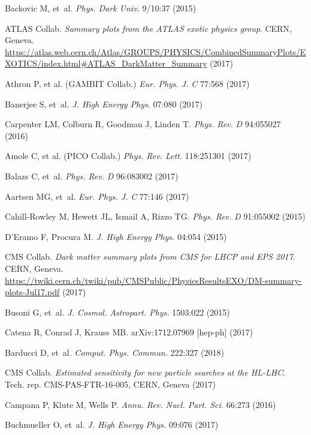 \documentclass{ar-1col}
\begin{document}
\begin{thebibliography}{175}
Backovic M, et~al. \textit{Phys. Dark Univ.} 9/10:37 (2015)

ATLAS Collab. \textit{Summary plots from the ATLAS exotic
physics group}. CERN, Geneva. \url{https://atlas.web.cern.ch/Atlas/GROUPS/PHYSICS/CombinedSummaryPlots/EXOTICS/index.html#ATLAS_DarkMatter_Summary} (2017)


{Athron P, et al. (GAMBIT Collab}.) \textit{Eur. Phys. J.} \textit{C} 77:568 (2017)

Banerjee S, et~al. \textit{J. High Energy Phys.} 07:080 (2017)

Carpenter LM, Colburn R, Goodman J, Linden T. \textit{Phys. Rev.}
\textit{D} 94:055027 (2016)

Amole C, et al. (PICO Collab.) \textit{Phys. Rev. Lett.} 118:251301 (2017)

Balazs C, et~al. \textit{Phys. Rev.} \textit{D} 96:083002 (2017)

Aartsen MG, et~al. \textit{Eur. Phys. J.} \textit{C} 77:146 (2017)

Cahill-Rowley M, Hewett JL, Ismail A, Rizzo TG. \textit{Phys.
Rev.} \textit{D} 91:055002 (2015)

D'Eramo F, Procura M. \textit{J. High Energy Phys.} 04:054 (2015)

CMS Collab. \textit{Dark \MakeLowercase{Matter Summary Plots} from CMS for LHCP and EPS 2017}. CERN, Geneva. \url{https://twiki.cern.ch/twiki/pub/CMSPublic/PhysicsResultsEXO/DM-summary-plots-Jul17.pdf} (2017)

Busoni G, et~al. \textit{J. Cosmol. Astropart. Phys.} 1503:022 (2015)

Catena R, Conrad J, Krauss MB. arXiv:1712.07969 [hep-ph] (2017)

Barducci D, et~al. \textit{Comput. Phys. Commun.} 222:327 (2018)

{CMS Collab}. \textit{Estimated sensitivity for new particle searches at the HL-LHC}.
Tech. rep. CMS-PAS-FTR-16-005, CERN, Geneva (2017)

Campana P, Klute M, Wells P. \textit{Annu. Rev. Nucl. Part. Sci.}
66:273 (2016)

Buchmueller O, et~al. \textit{J. High Energy Phys.} 09:076 (2017)


\end{thebibliography}
\end{document}
